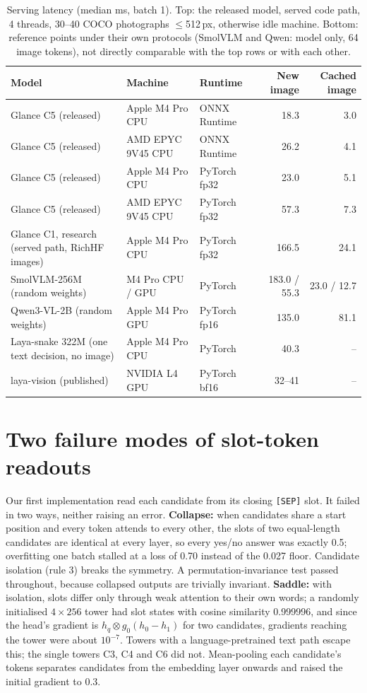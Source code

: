 \documentclass[10pt]{article}
\begin{document}
\begin{table}[t]
\centering\footnotesize
\caption{Serving latency (median ms, batch 1). Top: the released model, served code path, 4 threads, 30--40 COCO photographs $\le$512\,px, otherwise idle machine. Bottom: reference points under their own protocols (SmolVLM and Qwen: model only, 64 image tokens), not directly comparable with the top rows or with each other.}
\label{tab:serve}
\setlength\tabcolsep{3pt}
\begin{tabular}{lllrr}
\toprule
Model & Machine & Runtime & New image & Cached image \\
\midrule
Glance C5 (released) & Apple M4 Pro CPU & ONNX Runtime & 18.3 & 3.0 \\
Glance C5 (released) & AMD EPYC 9V45 CPU & ONNX Runtime & 26.2 & 4.1 \\
Glance C5 (released) & Apple M4 Pro CPU & PyTorch fp32 & 23.0 & 5.1 \\
Glance C5 (released) & AMD EPYC 9V45 CPU & PyTorch fp32 & 57.3 & 7.3 \\
\midrule
Glance C1, research (served path, RichHF images) & Apple M4 Pro CPU & PyTorch fp32 & 166.5 & 24.1 \\
SmolVLM-256M (random weights) & M4 Pro CPU / GPU & PyTorch & 183.0 / 55.3 & 23.0 / 12.7 \\
Qwen3-VL-2B (random weights) & Apple M4 Pro GPU & PyTorch fp16 & 135.0 & 81.1 \\
Laya-snake 322M (one text decision, no image) & Apple M4 Pro CPU & PyTorch & 40.3 & -- \\
laya-vision (published) & NVIDIA L4 GPU & PyTorch bf16 & 32--41 & -- \\
\bottomrule
\end{tabular}
\end{table}

\section{Two failure modes of slot-token readouts}\label{sec:readout}
Our first implementation read each candidate from its closing \texttt{[SEP]} slot. It failed in two ways, neither raising an error. \textbf{Collapse:} when candidates share a start position and every token attends to every other, the slots of two equal-length candidates are identical at every layer, so every yes/no answer was exactly 0.5; overfitting one batch stalled at a loss of 0.70 instead of the 0.027 floor. Candidate isolation (rule 3) breaks the symmetry. A permutation-invariance test passed throughout, because collapsed outputs are trivially invariant. \textbf{Saddle:} with isolation, slots differ only through weak attention to their own words; a randomly initialised $4\times256$ tower had slot states with cosine similarity 0.999996, and since the head's gradient is $h_q\otimes g_0(h_0-h_1)$ for two candidates, gradients reaching the tower were about $10^{-7}$. Towers with a language-pretrained text path escape this; the single towers C3, C4 and C6 did not. Mean-pooling each candidate's tokens separates candidates from the embedding layer onwards and raised the initial gradient to 0.3.
\end{document}
